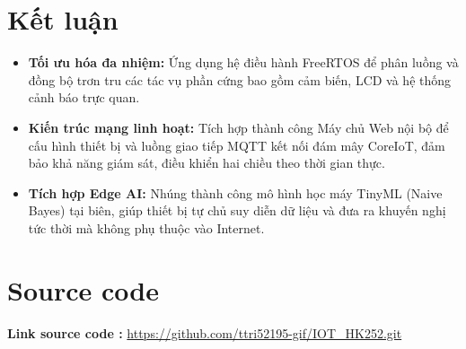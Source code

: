 \newpage
\section{Kết luận}
\begin{itemize}
    \item \textbf{Tối ưu hóa đa nhiệm:} Ứng dụng hệ điều hành FreeRTOS để phân luồng và đồng bộ trơn tru các tác vụ phần cứng bao gồm cảm biến, LCD và hệ thống cảnh báo trực quan.
    \item \textbf{Kiến trúc mạng linh hoạt:} Tích hợp thành công Máy chủ Web nội bộ để cấu hình thiết bị và luồng giao tiếp MQTT kết nối đám mây CoreIoT, đảm bảo khả năng giám sát, điều khiển hai chiều theo thời gian thực.
    \item \textbf{Tích hợp Edge AI:} Nhúng thành công mô hình học máy TinyML (Naive Bayes) tại biên, giúp thiết bị tự chủ suy diễn dữ liệu và đưa ra khuyến nghị tức thời mà không phụ thuộc vào Internet.
\end{itemize}

\section{Source code}
\textbf{Link source code :}  \url{https://github.com/ttri52195-gif/IOT_HK252.git}